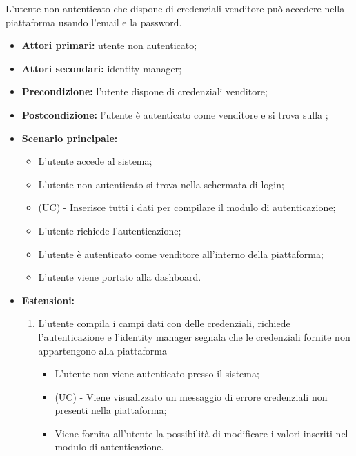 L'utente non autenticato che dispone di credenziali venditore può accedere nella piattaforma usando l'email e la password.
\begin{itemize}
    \item \textbf{Attori primari:} utente non autenticato;
    \item \textbf{Attori secondari:} identity manager;
    \item \textbf{Precondizione:} l'utente dispone di credenziali venditore;
    \item \textbf{Postcondizione:} l'utente è autenticato come venditore e si trova sulla ;
    \item \textbf{Scenario principale:}
    \begin{itemize}
    	\item L'utente accede al sistema;
    	\item L'utente non autenticato si trova nella schermata di login;
    	\item (UC) - Inserisce tutti i dati per compilare il modulo di autenticazione; %
    	\item L'utente richiede l'autenticazione;
    	\item L'utente è autenticato come venditore all'interno della piattaforma;
    	\item L'utente viene portato alla dashboard.
    \end{itemize}
	\item \textbf{Estensioni:}
	\begin{enumerate}[label=\lett]
		\item L'utente compila i campi dati con delle credenziali, richiede l'autenticazione e l'identity manager segnala che le credenziali fornite non appartengono alla piattaforma
		\begin{itemize}
			\item L'utente non viene autenticato presso il sistema;
			\item (UC) - Viene visualizzato un messaggio di errore credenziali non presenti nella piattaforma;
			\item Viene fornita all'utente la possibilità di modificare i valori inseriti nel modulo di autenticazione.
		\end{itemize}
	\end{enumerate} 
\end{itemize}

